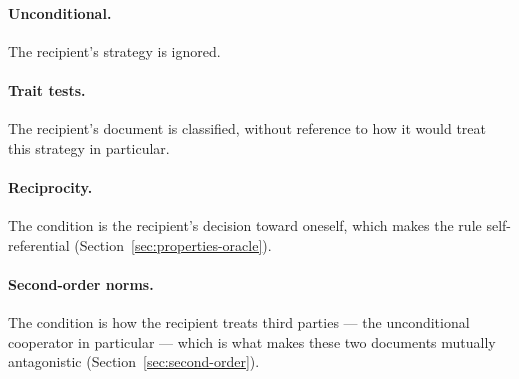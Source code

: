 \paragraph{Unconditional.}
The recipient's strategy is ignored.


\paragraph{Trait tests.}
The recipient's document is classified, without reference to how it
would treat this strategy in particular.


\paragraph{Reciprocity.}
The condition is the recipient's decision toward oneself, which
makes the rule self-referential (Section~\ref{sec:properties-oracle}).


\paragraph{Second-order norms.}
The condition is how the recipient treats third parties --- the
unconditional cooperator in particular --- which is what makes these
two documents mutually antagonistic
(Section~\ref{sec:second-order}).

